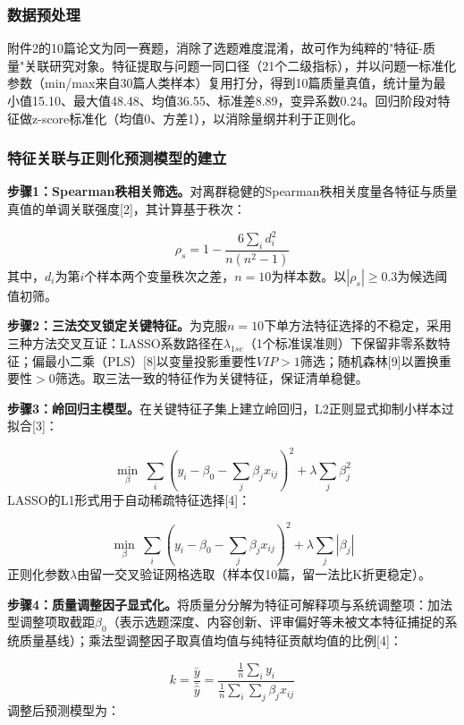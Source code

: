 \documentclass[withoutpreface]{cumcmthesis}
\begin{document}
\subsubsection{数据预处理}
附件2的10篇论文为同一赛题，消除了选题难度混淆，故可作为纯粹的"特征-质量"关联研究对象。特征提取与问题一同口径（21个二级指标），并以问题一标准化参数（min/max来自30篇人类样本）复用打分，得到10篇质量真值，统计量为最小值15.10、最大值48.48、均值36.55、标准差8.89，变异系数0.24。回归阶段对特征做z-score标准化（均值0、方差1），以消除量纲并利于正则化。

\subsubsection{特征关联与正则化预测模型的建立}
\textbf{步骤1：Spearman秩相关筛选。}对离群稳健的Spearman秩相关度量各特征与质量真值的单调关联强度[2]，其计算基于秩次：

\begin{equation}
\rho_s=1-\frac{6\sum_i d_i^2}{n(n^2-1)} \tag{11}
\end{equation}
其中，$d_i$为第$i$个样本两个变量秩次之差，$n=10$为样本数。以$|\rho_s|\ge 0.3$为候选阈值初筛。

\textbf{步骤2：三法交叉锁定关键特征。}为克服$n=10$下单方法特征选择的不稳定，采用三种方法交叉互证：LASSO系数路径在$\lambda_{1se}$（1个标准误准则）下保留非零系数特征；偏最小二乘（PLS）[8]以变量投影重要性$VIP>1$筛选；随机森林[9]以置换重要性$>0$筛选。取三法一致的特征作为关键特征，保证清单稳健。

\textbf{步骤3：岭回归主模型。}在关键特征子集上建立岭回归，L2正则显式抑制小样本过拟合[3]：

\begin{equation}
\min_{\beta}\ \sum_i\left(y_i-\beta_0-\sum_j\beta_j x_{ij}\right)^2+\lambda\sum_j\beta_j^2 \tag{12}
\end{equation}
LASSO的L1形式用于自动稀疏特征选择[4]：

\begin{equation}
\min_{\beta}\ \sum_i\left(y_i-\beta_0-\sum_j\beta_j x_{ij}\right)^2+\lambda\sum_j|\beta_j| \tag{13}
\end{equation}
正则化参数$\lambda$由留一交叉验证网格选取（样本仅10篇，留一法比K折更稳定）。

\textbf{步骤4：质量调整因子显式化。}将质量分分解为特征可解释项与系统调整项：加法型调整项取截距$\beta_0$（表示选题深度、内容创新、评审偏好等未被文本特征捕捉的系统质量基线）；乘法型调整因子取真值均值与纯特征贡献均值的比例[4]：

\begin{equation}
k=\frac{\bar y}{\bar{\hat y}}=\frac{\frac1n\sum_i y_i}{\frac1n\sum_i \sum_j\beta_j x_{ij}} \tag{14}
\end{equation}
调整后预测模型为：
\end{document}
